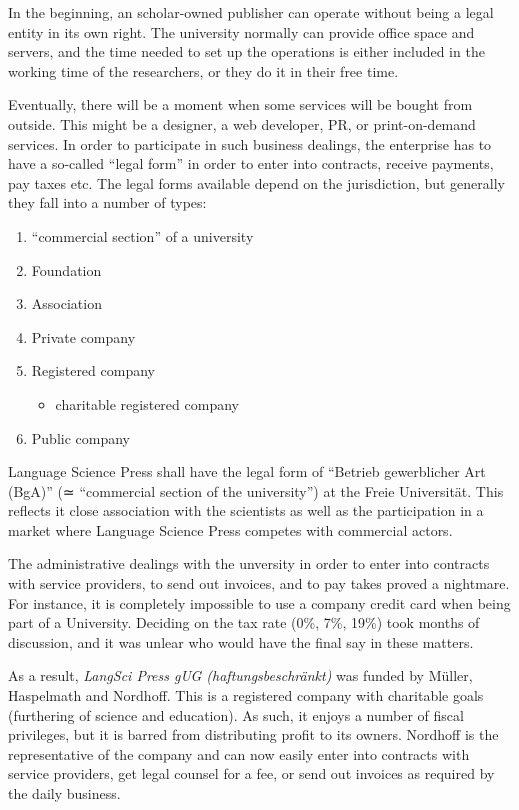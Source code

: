 \documentclass[output=guidelines,nonflat
]{langsci/langscibook}
\newcommand{\background}[1]{ 
  \vspace{5mm}
  \renewcommand{\tblslinecolour}{lsDarkBlue}
  \tblssy[red]{explore2}{Background}{#1}
}
\newcommand{\langscisolution}[1]{
  \renewcommand{\tblslinecolour}{lsLightBlue}
  \tblssy{langsci}{LangSci solution}{#1}
}
\newcommand{\evaluation}[1]{
  \renewcommand{\tblslinecolour}{lsLightOrange}
  \tblssy{receipt}{Evaluation}{#1}
}
\renewcommand{\tblssy}[4][black!12]{%
  \renewcommand{\langscisymbol}{#2}\renewcommand{\tblsboxcolor}{#1}
  \begin{mdframed}[style=yellowexercise,frametitle={#3}]
    #4
  \end{mdframed}
}
\begin{document}
\background{In the beginning, an scholar-owned publisher can operate without being a legal entity in its own right. The university normally can provide office space and servers, and the time needed to set up the operations is either included in the working time of the researchers, or they do it in their free time. 

Eventually, there will be a moment when some services will be bought from outside. This might be a designer, a web developer, PR, or print-on-demand services. In order to participate in such business dealings, the enterprise has to have a so-called ``legal form'' in order to enter into contracts, receive payments, pay taxes etc. The legal forms available depend on the jurisdiction, but generally they fall into a number of types:

\begin{enumerate}
 \item ``commercial section'' of a university
 \item Foundation 
 \item Association 
 \item Private company
 \item Registered company 
 \begin{itemize}
  \item charitable registered company
 \end{itemize}
 \item Public company 
\end{enumerate} 
}
\langscisolution{
Language Science Press shall have the legal form of ``Betrieb gewerblicher Art (BgA)'' (≃ ``commercial section of the university'') at the Freie Universität.
This reflects it close association with the scientists as well as the participation in a market where Language Science Press competes with commercial actors. 
}
\evaluation{
The administrative dealings with the unversity in order to enter into contracts with service providers, to send out invoices, and to pay takes proved a nightmare. For instance, it is completely impossible to use a company credit card when being part of a University. Deciding on the tax rate (0\%, 7\%, 19\%) took months of discussion, and it was unlear who would have the final say in these matters. 

As a result, \textit{LangSci Press gUG (haftungsbeschränkt)} was funded by Müller, Haspelmath and Nordhoff. This is a registered company with charitable goals (furthering of science and education). As such, it enjoys a number of fiscal privileges, but it is barred from  distributing profit to its owners. Nordhoff is the representative of the company and can now easily enter into contracts with service providers, get legal counsel for a fee, or send out invoices as required by the daily business. 
}
\end{document}
